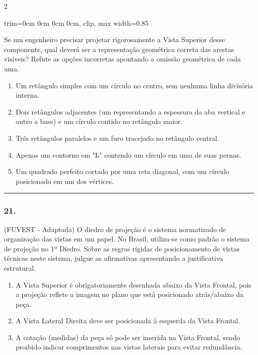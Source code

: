 \documentclass[twoside, 10pt, a4paper]{article}
\newlength{\espacoPreQuestao}\setlength{\espacoPreQuestao}{0.1cm}
\newlength{\espacoQuestao}\setlength{\espacoQuestao}{0.2cm}
\newlength{\espacoAlt}\setlength{\espacoAlt}{0.2cm}
\newcommand{\larguraTikz}{0.85\linewidth}
\begin{document}
\begin{multicols*}{2}
\begin{center}
\begin{adjustbox}{trim=0cm 0cm 0cm 0cm, clip, max width=\larguraTikz}
\end{adjustbox}
\end{center}
Se um engenheiro precisar projetar rigorosamente a Vista Superior desse componente, qual deverá ser a representação geométrica correta das arestas visíveis? Refute as opções incorretas apontando a omissão geométrica de cada uma.
\begin{enumerate}[label=\alph*), itemsep=\espacoAlt]
\item Um retângulo simples com um círculo no centro, sem nenhuma linha divisória interna.
\item Dois retângulos adjacentes (um representando a espessura da aba vertical e outro a base) e um círculo contido no retângulo maior.
\item Três retângulos paralelos e um furo tracejado no retângulo central.
\item Apenas um contorno em "L" contendo um círculo em uma de suas pernas.
\item Um quadrado perfeito cortado por uma reta diagonal, com um círculo posicionado em um dos vértices.
\end{enumerate}
\par\vspace{\espacoQuestao}

\noindent\textcolor{CorLinha}{\rule{\linewidth}{0.5pt}} 
\par\vspace{\espacoPreQuestao}
\subsubsection*{21.} (FUVEST - Adaptada) O diedro de projeção é o sistema normatizado de organização das vistas em um papel. No Brasil, utiliza-se como padrão o sistema de projeção no 1º Diedro. Sobre as regras rígidas de posicionamento de vistas técnicas neste sistema, julgue as afirmativas apresentando a justificativa estrutural.
\begin{enumerate}[label=\Roman*., itemsep=\espacoAlt]
\item A Vista Superior é obrigatoriamente desenhada abaixo da Vista Frontal, pois a projeção reflete a imagem no plano que está posicionado atrás/abaixo da peça.
\item A Vista Lateral Direita deve ser posicionada à esquerda da Vista Frontal.
\item A cotação (medidas) da peça só pode ser inserida na Vista Frontal, sendo proibido indicar comprimentos nas vistas laterais para evitar redundância.
\end{enumerate}
\par\vspace{\espacoQuestao}


\end{multicols*}
\end{document}

